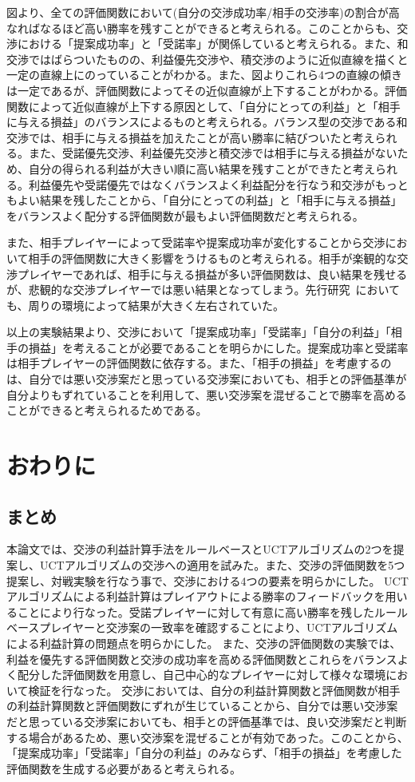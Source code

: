 \documentclass[a4, 10pt,dvipdfmx]{jsarticle}
\begin{document}
図より、全ての評価関数において(自分の交渉成功率/相手の交渉率)の割合が高なればなるほど高い勝率を残すことができると考えられる。このことからも、交渉における「提案成功率」と「受諾率」が関係していると考えられる。また、和交渉ではばらついたものの、利益優先交渉や、積交渉のように近似直線を描くと一定の直線上にのっていることがわかる。また、図よりこれら4つの直線の傾きは一定であるが、評価関数によってその近似直線が上下することがわかる。評価関数によって近似直線が上下する原因として、「自分にとっての利益」と「相手に与える損益」のバランスによるものと考えられる。バランス型の交渉である和交渉では、相手に与える損益を加えたことが高い勝率に結びついたと考えられる。また、受諾優先交渉、利益優先交渉と積交渉では相手に与える損益がないため、自分の得られる利益が大きい順に高い結果を残すことができたと考えられる。利益優先や受諾優先ではなくバランスよく利益配分を行なう和交渉がもっともよい結果を残したことから、「自分にとっての利益」と「相手に与える損益」をバランスよく配分する評価関数が最もよい評価関数だと考えられる。

また、相手プレイヤーによって受諾率や提案成功率が変化することから交渉において相手の評価関数に大きく影響をうけるものと考えられる。相手が楽観的な交渉プレイヤーであれば、相手に与える損益が多い評価関数は、良い結果を残せるが、悲観的な交渉プレイヤーでは悪い結果となってしまう。先行研究~\cite{ito2012complex}においても、周りの環境によって結果が大きく左右されていた。

以上の実験結果より、交渉において「提案成功率」「受諾率」「自分の利益」「相手の損益」を考えることが必要であることを明らかにした。提案成功率と受諾率は相手プレイヤーの評価関数に依存する。また、「相手の損益」を考慮するのは、自分では悪い交渉案だと思っている交渉案においても、相手との評価基準が自分よりもずれていることを利用して、悪い交渉案を混ぜることで勝率を高めることができると考えられるためである。

\section{おわりに}
\subsection{まとめ}
本論文では、交渉の利益計算手法をルールベースとUCTアルゴリズムの2つを提案し、UCTアルゴリズムの交渉への適用を試みた。また、交渉の評価関数を5つ提案し、対戦実験を行なう事で、交渉における4つの要素を明らかにした。
UCTアルゴリズムによる利益計算はプレイアウトによる勝率のフィードバックを用いることにより行なった。受諾プレイヤーに対して有意に高い勝率を残したルールベースプレイヤーと交渉案の一致率を確認することにより、UCTアルゴリズムによる利益計算の問題点を明らかにした。
また、交渉の評価関数の実験では、利益を優先する評価関数と交渉の成功率を高める評価関数とこれらをバランスよく配分した評価関数を用意し、自己中心的なプレイヤーに対して様々な環境において検証を行なった。
交渉においては、自分の利益計算関数と評価関数が相手の利益計算関数と評価関数にずれが生じていることから、自分では悪い交渉案だと思っている交渉案においても、相手との評価基準では、良い交渉案だと判断する場合があるため、悪い交渉案を混ぜることが有効であった。このことから、「提案成功率」「受諾率」「自分の利益」のみならず、「相手の損益」を考慮した評価関数を生成する必要があると考えられる。
\end{document}
